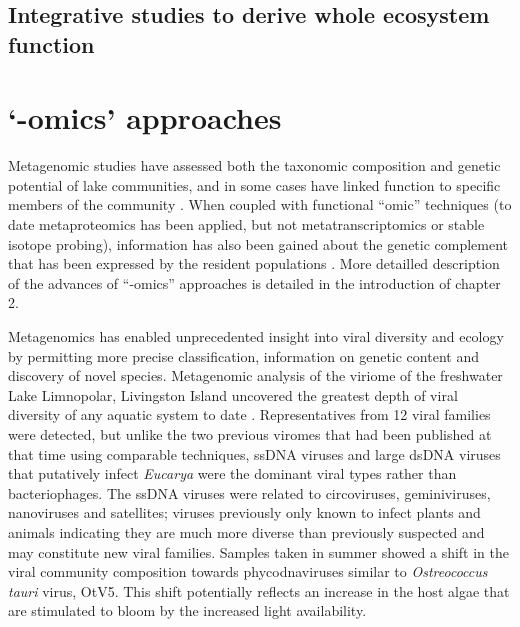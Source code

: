\subsection{Integrative studies to derive whole ecosystem function}


\section{`-omics' approaches}
Metagenomic studies have assessed both the taxonomic composition and genetic potential of lake communities, and in some cases have linked function to specific members of the community 
\cite{Lopez-Bueno2009, Ng2010a, Lauro2011, Yau2011, Varin2012}.
When coupled with functional ``omic'' techniques (to date metaproteomics has been applied, but not metatranscriptomics or stable isotope probing), 
information has also been gained about the genetic complement that has been expressed by the resident populations \cite{Ng2010a,Lauro2011}.
More detailled description of the advances of ``-omics'' approaches is detailed in the introduction of chapter 2.

Metagenomics has enabled unprecedented insight into viral diversity and ecology by permitting more precise classification, information on genetic content and discovery of novel species. 
Metagenomic analysis of the viriome of the freshwater Lake Limnopolar, Livingston Island uncovered the greatest depth of viral diversity of any aquatic system to date \cite{Lopez-Bueno2009}.
Representatives from 12 viral families were detected, but unlike the two previous viromes that had been published at that time using comparable techniques, ss\textsc{DNA} viruses and large ds\textsc{DNA} viruses that putatively infect \emph{Eucarya} were the dominant viral types rather than bacteriophages. 
The ss\textsc{DNA} viruses were related to circoviruses, geminiviruses, nanoviruses and satellites; viruses previously only known to infect plants and animals indicating they are much more diverse than previously suspected and may constitute new viral families. 
Samples taken in summer showed a shift in the viral community composition towards phycodnaviruses similar to \emph{Ostreococcus tauri} virus, OtV5. 
This shift potentially reflects an increase in the host algae that are stimulated to bloom by the increased light availability.



